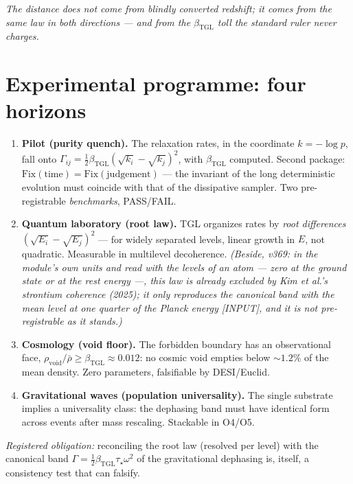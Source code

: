 \documentclass[11pt]{article}
\newcommand{\bTGL}{\beta_{\mathrm{TGL}}}\newcommand{\Msun}{M_{\odot}}\newcommand{\TGL}{\mathrm{TGL}}
\theoremstyle{definition}\newtheorem{deriv}{Derivation}
\begin{document}
\emph{The distance does not come from blindly converted redshift; it comes from the same law in both directions --- and from the $\bTGL$ toll the standard ruler never charges.}

\section{Experimental programme: four horizons}\label{sec:horizons}

\begin{enumerate}

\item \textbf{Pilot (purity quench).} The relaxation rates, in the coordinate $k=-\log p$, fall onto $\Gamma_{ij}=\tfrac12\bTGL(\sqrt{k_i}-\sqrt{k_j})^2$, with $\bTGL$ computed. Second package: $\mathrm{Fix}(\text{time})=\mathrm{Fix}(\text{judgement})$ --- the invariant of the long deterministic evolution must coincide with that of the dissipative sampler. Two pre-registrable \emph{benchmarks}, PASS/FAIL.

\item \textbf{Quantum laboratory (root law).} TGL organizes rates by \emph{root differences} $(\sqrt{E_i}-\sqrt{E_j})^2$ --- for widely separated levels, linear growth in $E$, not quadratic. Measurable in multilevel decoherence. \emph{(Beside, v369: in the module's own units and read with the levels of an atom --- zero at the ground state or at the rest energy ---, this law is already excluded by Kim et al.'s strontium coherence (2025); it only reproduces the canonical band with the mean level at one quarter of the Planck energy [INPUT], and it is not pre-registrable as it stands.)}

\item \textbf{Cosmology (void floor).} The forbidden boundary has an observational face, $\rho_{\mathrm{void}}/\bar\rho\geq\bTGL\approx0.012$: no cosmic void empties below $\sim1.2\%$ of the mean density. Zero parameters, falsifiable by DESI/Euclid.

\item \textbf{Gravitational waves (population universality).} The single substrate implies a universality class: the dephasing band must have identical form across events after mass rescaling. Stackable in O4/O5.

\end{enumerate}

\emph{Registered obligation:} reconciling the root law (resolved per level) with the canonical band $\Gamma=\tfrac12\bTGL\tau_\star\omega^2$ of the gravitational dephasing is, itself, a consistency test that can falsify.
\end{document}
